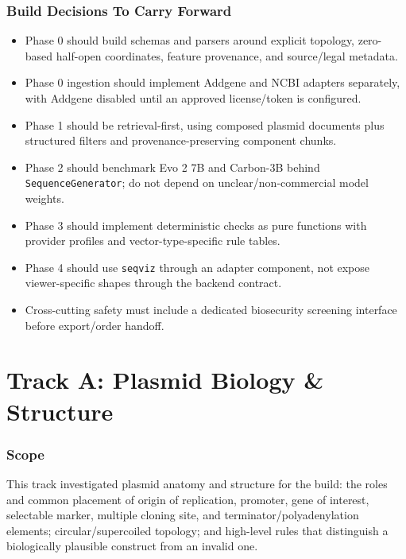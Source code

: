 \documentclass[11pt]{report}
\begin{document}
\subsection{Build Decisions To Carry Forward}

\begin{itemize}
\item Phase 0 should build schemas and parsers around explicit topology, zero-based half-open coordinates, feature provenance, and source/legal metadata.
\item Phase 0 ingestion should implement Addgene and NCBI adapters separately, with Addgene disabled until an approved license/token is configured.
\item Phase 1 should be retrieval-first, using composed plasmid documents plus structured filters and provenance-preserving component chunks.
\item Phase 2 should benchmark Evo 2 7B and Carbon-3B behind \texttt{SequenceGenerator}; do not depend on unclear/non-commercial model weights.
\item Phase 3 should implement deterministic checks as pure functions with provider profiles and vector-type-specific rule tables.
\item Phase 4 should use \texttt{seqviz} through an adapter component, not expose viewer-specific shapes through the backend contract.
\item Cross-cutting safety must include a dedicated biosecurity screening interface before export/order handoff.
\end{itemize}
\chapter{Track A: Plasmid Biology \& Structure}

\subsection{Scope}
This track investigated plasmid anatomy and structure for the build: the roles and common placement of origin of replication, promoter, gene of interest, selectable marker, multiple cloning site, and terminator/polyadenylation elements; circular/supercoiled topology; and high-level rules that distinguish a biologically plausible construct from an invalid one.\par
\end{document}
